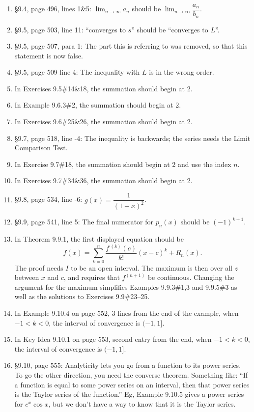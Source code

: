 \documentclass{amsart}
\newcommand{\ds}{\displaystyle}
\begin{document}
\begin{enumerate}
\item \S9.4, page 496, lines 1\&5: $\ds\lim_{n\to\infty}a_n$ should be $\ds\lim_{n\to\infty}\dfrac{a_n}{b_n}$.
\item \S9.5, page 503, line 11: ``converges to $s$'' should be ``converges to $L$''.
\item \S9.5, page 507, para 1: The part this is referring to was removed, so that this statement is now false.
\item \S9.5, page 509 line 4: The inequality with $L$ is in the wrong order.
\item In Exercises 9.5\#14\&18, the summation should begin at 2.
\item In Example 9.6.3\#2, the summation should begin at 2.
\item In Exercises 9.6\#25\&26, the summation should begin at 2.
\item \S9.7, page 518, line -4: The inequality is backwards; the series needs the Limit Comparison Test.
\item In Exercise 9.7\#18, the summation should begin at 2 and use the index $n$.
\item In Exercises 9.7\#34\&36, the summation should begin at 2.
\item \S9.8, page 534, line -6: $g(x)=\dfrac1{(1-x)^2}$.
\item \S9.9, page 541, line 5: The final numerator for $p_n(x)$ should be $(-1)^{k+1}$.
\item In Theorem 9.9.1, the first displayed equation should be
\[f(x) = \sum_{k=0}^n\frac{f\,^{(k)}(c)}{k!}(x-c)^k+R_n(x).\]
The proof needs $I$ to be an open interval.  The maximum is then over all $z$ between $x$ and $c$, and requires that $f^{(n+1)}$ be continuous.  Changing the argument for the maximum simplifies Examples 9.9.3\#1,3 and 9.9.5\#3 as well as the solutions to Exercises 9.9\#23--25.
\item In Example 9.10.4 on page 552, 3 lines from the end of the example, when $-1<k<0$, the interval of convergence is $(-1,1]$.
\item In Key Idea 9.10.1 on page 553, second entry from the end, when $-1<k<0$, the interval of convergence is $(-1,1]$.
\item \S9.10, page 555: Analyticity lets you go from a function to its power series.  To go the other direction, you need the converse theorem.  Something like: ``If a function is equal to some power series on an interval, then that power series is the Taylor series of the function.''  Eg, Example 9.10.5 gives a power series for $e^x\cos x$, but we don't have a way to know that it is the Taylor series.

\end{enumerate}
\end{document}
